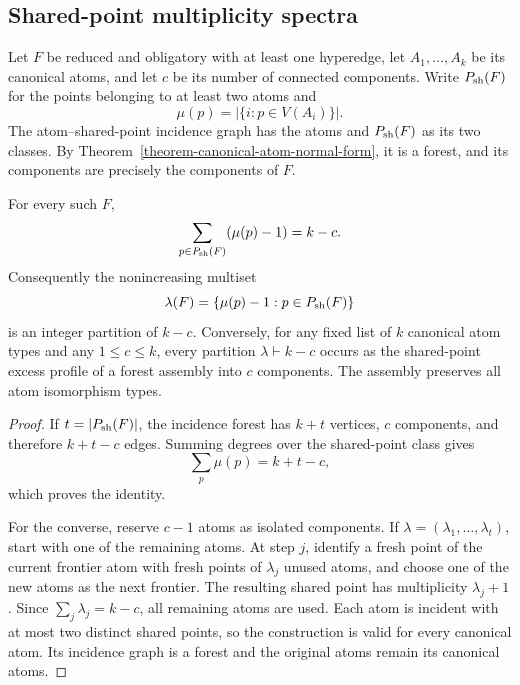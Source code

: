 
\subsection{Shared-point multiplicity spectra}
\label{shared-point-multiplicity-spectra}

Let $F$ be reduced and obligatory with at least one hyperedge, let
$A_1,\ldots,A_k$ be its canonical atoms, and let $c$ be its number of
connected components.  Write $P_{\rm sh}(F)$ for the points belonging to at
least two atoms and
\[
\mu(p)=|\{i:p\in V(A_i)\}|.
\]
The atom--shared-point incidence graph has the atoms and $P_{\rm sh}(F)$ as
its two classes.  By Theorem~\ref{theorem-canonical-atom-normal-form}, it is a
forest, and its components are precisely the components of $F$.

\begin{theorem}
\label{theorem-exact-shared-point-excess-profile}
For every such $F$,
\[
\sum_{p\in P_{\rm sh}(F)}(\mu(p)-1)=k-c.
\]
Consequently the nonincreasing multiset
\[
\lambda(F)=\{\mu(p)-1:p\in P_{\rm sh}(F)\}
\]
is an integer partition of $k-c$.  Conversely, for any fixed list of $k$
canonical atom types and any $1\le c\le k$, every partition
$\lambda\vdash k-c$ occurs as the shared-point excess profile of a forest
assembly into $c$ components.  The assembly preserves all atom isomorphism
types.
\end{theorem}
\begin{proof}
If $t=|P_{\rm sh}(F)|$, the incidence forest has $k+t$ vertices, $c$
components, and therefore $k+t-c$ edges.  Summing degrees over the
shared-point class gives
\[
\sum_p\mu(p)=k+t-c,
\]
which proves the identity.

For the converse, reserve $c-1$ atoms as isolated components.  If
$\lambda=(\lambda_1,\ldots,\lambda_t)$, start with one of the remaining
atoms.  At step $j$, identify a fresh point of the current frontier atom with
fresh points of $\lambda_j$ unused atoms, and choose one of the new atoms as
the next frontier.  The resulting shared point has multiplicity
$\lambda_j+1$.  Since $\sum_j\lambda_j=k-c$, all remaining atoms are used.
Each atom is incident with at most two distinct shared points, so the
construction is valid for every canonical atom.  Its incidence graph is a
forest and the original atoms remain its canonical atoms.
\end{proof}

